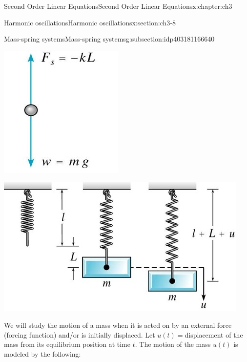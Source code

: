 \documentclass[oneside,10pt,]{book}
\numberwithin{equation}{section}
\numberwithin{equation}{section}
\begin{document}
\begin{chapterptx}{Second Order Linear Equations}{}{Second Order Linear Equations}{}{}{x:chapter:ch3}
\begin{sectionptx}{Harmonic oscillations}{}{Harmonic oscillations}{}{}{x:section:ch3-8}
\begin{subsectionptx}{Mass-spring systems}{}{Mass-spring systems}{}{}{g:subsection:idp403181166640}
\begin{sidebyside}{2}{0}{0}{0}
\begin{sbspanel}{0.5}
\includegraphics[width=\linewidth]{images/Spring1.jpg}
\end{sbspanel}%
\begin{sbspanel}{0.5}%
\includegraphics[width=\linewidth]{images/Spring2.jpg}
\end{sbspanel}%
\end{sidebyside}%
%
\par
We will study the motion of a mass when it is acted on by an external force (forcing function) and\slash{}or is initially displaced. Let \(u(t)=\)displacement of the mass from its equilibrium position at time \(t\). The motion of the mass \(u(t)\) is modeled by the following:%

\end{subsectionptx}
\end{sectionptx}
\end{chapterptx}
\end{document}
